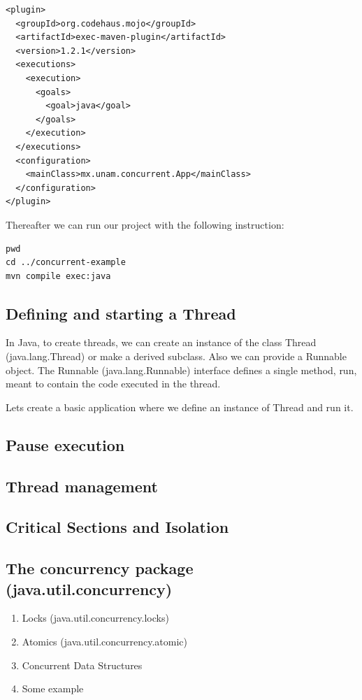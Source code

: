 \documentclass[openany, a4paper]{book}
\theoremstyle{break}
\theoremstyle{example}
\theoremstyle{note}
\theoremstyle{break}
\theoremstyle{exercise}
\begin{document}
\begin{verbatim}
<plugin>
  <groupId>org.codehaus.mojo</groupId>
  <artifactId>exec-maven-plugin</artifactId>
  <version>1.2.1</version>
  <executions>
    <execution>
      <goals>
        <goal>java</goal>
      </goals>
    </execution>
  </executions>
  <configuration>
    <mainClass>mx.unam.concurrent.App</mainClass>
  </configuration>
</plugin>
\end{verbatim}

Thereafter we can run our project with the following instruction:

\begin{verbatim}
pwd
cd ../concurrent-example
mvn compile exec:java
\end{verbatim}

\subsection{Defining and starting a Thread}
\label{sec:orgf654267}

In Java, to create threads, we can create an instance of the class Thread
(java.lang.Thread) or make a derived subclass. Also we can provide a
Runnable object. The Runnable (java.lang.Runnable) interface defines a
single method, run, meant to contain the code executed in the thread.

Lets create a basic application where we define an instance of Thread and
run it.



\subsection{Pause execution}
\label{sec:orgc2bb396}
\subsection{Thread management}
\label{sec:org94f7d4d}
\subsection{Critical Sections and Isolation}
\label{sec:orgedca29c}
\subsection{The concurrency package (java.util.concurrency)}
\label{sec:org7ef2c76}
\begin{enumerate}
\item Locks (java.util.concurrency.locks)
\label{sec:org55e9fbb}
\item Atomics (java.util.concurrency.atomic)
\label{sec:org3b601e5}
\item Concurrent Data Structures
\label{sec:org49d24d3}
\item Some example
\label{sec:org47fe350}
\end{enumerate}
\end{document}
